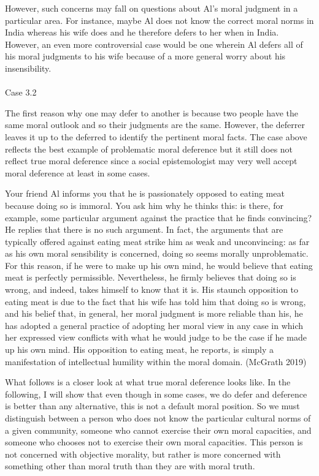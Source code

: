 \documentclass[
  letterpaper,
  DIV=11,
  numbers=noendperiod]{scrartcl}
\makeatletter
\let\oldparagraph\paragraph
\renewcommand{\paragraph}{
    \@ifstar
      \xxxParagraphStar
      \xxxParagraphNoStar
  }
\newcommand{\xxxParagraphStar}[1]{\oldparagraph*{#1}\mbox{}}
\newcommand{\xxxParagraphNoStar}[1]{\oldparagraph{#1}\mbox{}}
\theoremstyle{remark}
\makeatother
\begin{document}
However, such concerns may fall on questions about Al's moral judgment
in a particular area. For instance, maybe Al does not know the correct
moral norms in India whereas his wife does and he therefore defers to
her when in India. However, an even more controversial case would be one
wherein Al defers all of his moral judgments to his wife because of a
more general worry about his insensibility.

\paragraph{Case 3.2}\label{case-3.2}

The first reason why one may defer to another is because two people have
the same moral outlook and so their judgments are the same. However, the
deferrer leaves it up to the deferred to identify the pertinent moral
facts. The case above reflects the best example of problematic moral
deference but it still does not reflect true moral deference since a
social epistemologist may very well accept moral deference at least in
some cases.

Your friend Al informs you that he is passionately opposed to eating
meat because doing so is immoral. You ask him why he thinks this: is
there, for example, some particular argument against the practice that
he finds convincing? He replies that there is no such argument. In fact,
the arguments that are typically offered against eating meat strike him
as weak and unconvincing: as far as his own moral sensibility is
concerned, doing so seems morally unproblematic. For this reason, if he
were to make up his own mind, he would believe that eating meat is
perfectly permissible. Nevertheless, he firmly believes that doing so is
wrong, and indeed, takes himself to know that it is. His staunch
opposition to eating meat is due to the fact that his wife has told him
that doing so is wrong, and his belief that, in general, her moral
judgment is more reliable than his, he has adopted a general practice of
adopting her moral view in any case in which her expressed view
conflicts with what he would judge to be the case if he made up his own
mind. His opposition to eating meat, he reports, is simply a
manifestation of intellectual humility within the moral domain. (McGrath
2019)

What follows is a closer look at what true moral deference looks like.
In the following, I will show that even though in some cases, we do
defer and deference is better than any alternative, this is not a
default moral position. So we must distinguish between a person who does
not know the particular cultural norms of a given community, someone who
cannot exercise their own moral capacities, and someone who chooses not
to exercise their own moral capacities. This person is not concerned
with objective morality, but rather is more concerned with something
other than moral truth than they are with moral truth.
\end{document}

